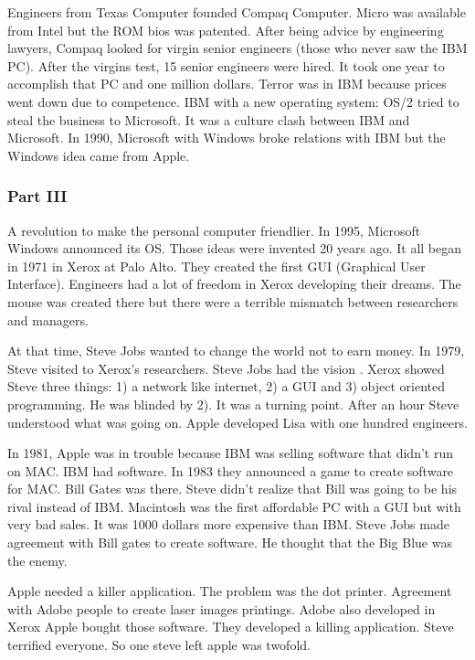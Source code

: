  Engineers from Texas Computer founded Compaq Computer. 
 Micro was available from Intel but the ROM bios was patented.
 After being advice by engineering lawyers, Compaq looked for virgin senior engineers 
 (those who never saw the IBM PC).  After the virgins test, 15 senior engineers were hired. 
 It took one year to accomplish that PC and one million dollars. 
 Terror was in IBM because prices went down due to competence.   
 IBM with a new operating system: OS/2 tried to steal the business to Microsoft. 
 It was a culture clash between IBM and Microsoft. 
 In 1990,  Microsoft with Windows broke 
 relations with IBM but the Windows idea came from Apple.   
   
  

 \subsubsection*{Part III} 
 A revolution to make the personal computer friendlier.  
 In 1995,  Microsoft Windows announced its OS. 
 Those ideas were invented 20 years ago. 
 It all began in 1971 in  Xerox at Palo Alto. 
 They created the first GUI (Graphical User Interface).
 Engineers had a lot of freedom in Xerox developing  their dreams. The mouse was 
 created there but there were a terrible mismatch between researchers and managers. 
 
 At that time, Steve Jobs wanted to change the world not to earn money.
 In 1979, Steve  visited to Xerox's researchers. 
 Steve Jobs had the vision . Xerox showed Steve three things: 1) a network like internet, 
 2) a GUI and  3) object oriented programming. He 
 was blinded by 2). It was a turning point. 
 After an hour Steve understood what was going on. 
 Apple developed Lisa with one hundred engineers. 
   
 In 1981, Apple was in trouble because IBM was selling software that didn't run on MAC. 
 IBM had software. In 1983 they announced a game to 
 create software for MAC. Bill Gates was there. 
 Steve didn't realize that Bill was going to be his rival instead of IBM. 
 Macintosh was the first 
 affordable PC with a GUI but with  very bad sales. 
 It was 1000 dollars more expensive than IBM.  
 Steve Jobs made agreement with Bill gates to create software. 
 He thought that the Big Blue was the enemy. 
   
   
 Apple needed a killer application. 
 The problem was the dot printer. Agreement with Adobe people to create laser images printings. 
 Adobe also developed in Xerox 
 Apple bought those software.
 They developed a killing application. 
 Steve terrified everyone. 
 So one steve left apple was twofold. 
   
